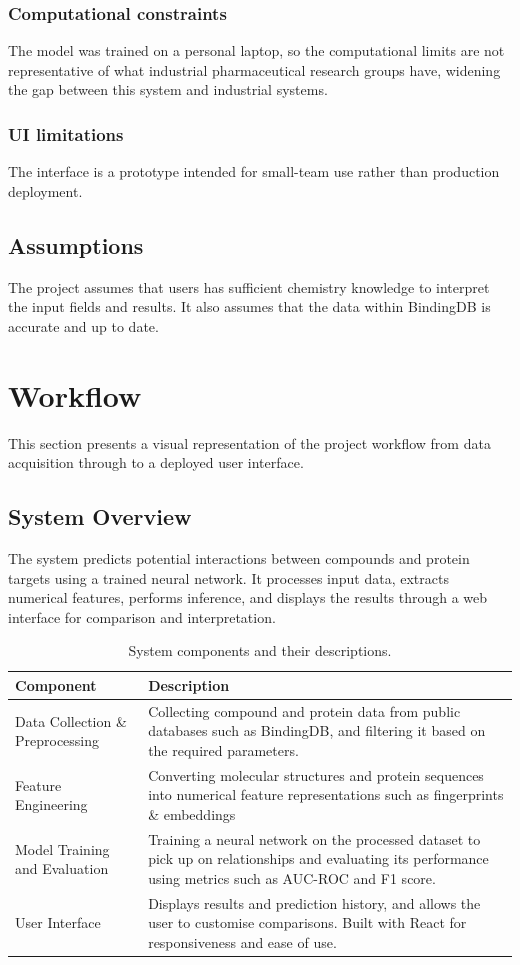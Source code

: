 \subsubsection{Computational constraints}
The model was trained on a personal laptop, so the computational limits are not representative of what industrial pharmaceutical research groups have, widening the gap between this system and industrial systems.
\subsubsection{UI limitations}
The interface is a prototype intended for small-team use rather than production deployment.
\subsection{Assumptions}
The project assumes that users has sufficient chemistry knowledge to interpret the input fields and results.
It also assumes that the data within BindingDB is accurate and up to date.

\section{Workflow}
This section presents a visual representation of the project workflow from data acquisition through to a deployed user interface.
\subsection{System Overview}
The system predicts potential interactions between compounds and protein targets using a trained neural network.
It processes input data, extracts numerical features, performs inference, and displays the results through a web interface for comparison and interpretation.
\begin{table}[h!]
    \centering
    \begin{tabular}{@{}lp{10cm}@{}}
    \toprule
    \textbf{Component} & \textbf{Description} \\
    \midrule
    Data Collection \& Preprocessing & Collecting compound and protein data from public databases such as BindingDB, and filtering it based on the required parameters. \\
    \addlinespace
    \midrule
    Feature Engineering & Converting molecular structures and protein sequences into numerical feature representations such as fingerprints \& embeddings \\
    \addlinespace
    \midrule
    Model Training and Evaluation & Training a neural network on the processed dataset to pick up on relationships and evaluating its performance using metrics such as AUC-ROC and F1 score. \\
    \addlinespace
    \midrule
    User Interface & Displays results and prediction history, and allows the user to customise comparisons. Built with React for responsiveness and ease of use. \\
    \bottomrule
    \end{tabular}
    \caption{System components and their descriptions.}
    \label{tab:system_components}
\end{table}
